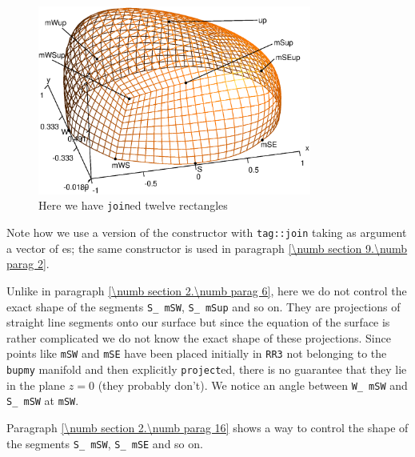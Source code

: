 \begin{figure}[ht] \centering
  \includegraphics[width=90mm]{hemisphere-2}
  \caption{Here we have {\small\tt join}ed twelve rectangles}
  \label{\numb section 2.\numb fig 7}
\end{figure}

Note how we use a version of the {\small\tt{}} constructor with
{\small\tt\textcolor{tag}{tag}::join} taking as argument a vector of {\small\tt {}}es;
the same constructor is used in paragraph \ref{\numb section 9.\numb parag 2}.

Unlike in paragraph \ref{\numb section 2.\numb parag 6}, here we do not control the
exact shape of the segments {\small\tt S\_\,mSW}, {\small\tt S\_\,mSup} and so on.
They are projections of straight line segments onto our surface but since the equation
of the surface is rather complicated we do not know the exact shape of these projections.
Since points like {\small\tt mSW} and {\small\tt mSE} have been placed initially in
{\small\tt RR3} not belonging to the {\small\tt bupmy} manifold and then explicitly
{\small\tt project}ed,
there is no guarantee that they lie in the plane $ z = 0 $ (they probably don't).
We notice an angle between {\small\tt W\_\,mSW} and {\small\tt S\_\,mSW} at {\small\tt mSW}.

Paragraph \ref{\numb section 2.\numb parag 16} shows a way to control the shape of the segments
{\small\tt S\_\,mSW}, {\small\tt S\_\,mSE} and so on.

